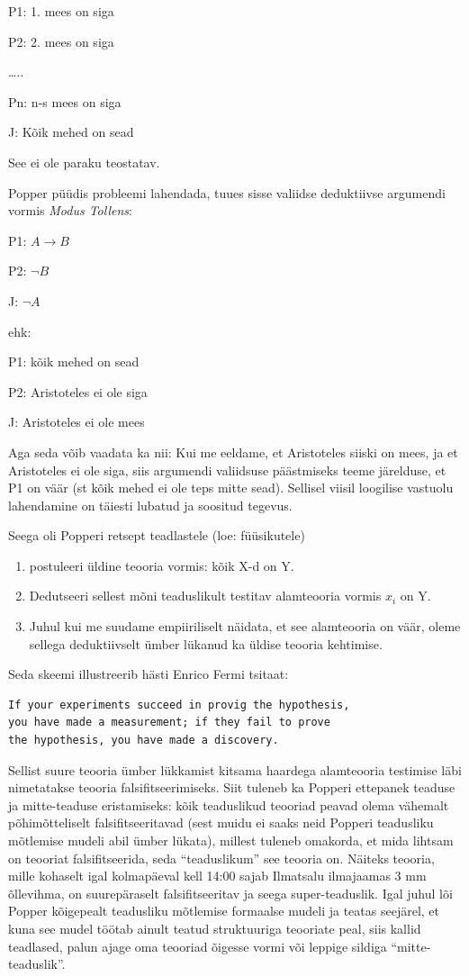 \documentclass[]{book}
\begin{document}
P1: 1. mees on siga

P2: 2. mees on siga

\ldots{}..

Pn: n-s mees on siga

J: Kõik mehed on sead

See ei ole paraku teostatav.

Popper püüdis probleemi lahendada, tuues sisse valiidse deduktiivse argumendi vormis \emph{Modus Tollens}:

P1: \(A \rightarrow B\)

P2: \(\neg B\)

J: \(\neg A\)

ehk:

P1: kõik mehed on sead

P2: Aristoteles ei ole siga

J: Aristoteles ei ole mees

Aga seda võib vaadata ka nii: Kui me eeldame, et Aristoteles siiski on mees, ja et Aristoteles ei ole siga, siis argumendi valiidsuse päästmiseks teeme järelduse, et P1 on väär (st kõik mehed ei ole teps mitte sead). Sellisel viisil loogilise vastuolu lahendamine on täiesti lubatud ja soositud tegevus.

Seega oli Popperi retsept teadlastele (loe: füüsikutele)

\begin{enumerate}
\def\labelenumi{\arabic{enumi}.}
\item
  postuleeri üldine teooria vormis: kõik X-d on Y.
\item
  Dedutseeri sellest mõni teaduslikult testitav alamteooria vormis \(x_i\) on Y.
\item
  Juhul kui me suudame empiiriliselt näidata, et see alamteooria on väär, oleme sellega deduktiivselt ümber lükanud ka üldise teooria kehtimise.
\end{enumerate}

Seda skeemi illustreerib hästi Enrico Fermi tsitaat:

\begin{verbatim}
If your experiments succeed in provig the hypothesis, 
you have made a measurement; if they fail to prove 
the hypothesis, you have made a discovery.
\end{verbatim}

Sellist suure teooria ümber lükkamist kitsama haardega alamteooria testimise läbi nimetatakse teooria falsifitseerimiseks. Siit tuleneb ka Popperi ettepanek teaduse ja mitte-teaduse eristamiseks: kõik teaduslikud teooriad peavad olema vähemalt põhimõtteliselt falsifitseeritavad (sest muidu ei saaks neid Popperi teadusliku mõtlemise mudeli abil ümber lükata), millest tuleneb omakorda, et mida lihtsam on teooriat falsifitseerida, seda ``teaduslikum'' see teooria on. Näiteks teooria, mille kohaselt igal kolmapäeval kell 14:00 sajab Ilmatsalu ilmajaamas 3 mm õllevihma, on suurepäraselt falsifitseeritav ja seega super-teaduslik. Igal juhul lõi Popper kõigepealt teadusliku mõtlemise formaalse mudeli ja teatas seejärel, et kuna see mudel töötab ainult teatud struktuuriga teooriate peal, siis kallid teadlased, palun ajage oma teooriad õigesse vormi või leppige sildiga ``mitte-teaduslik''.
\end{document}
